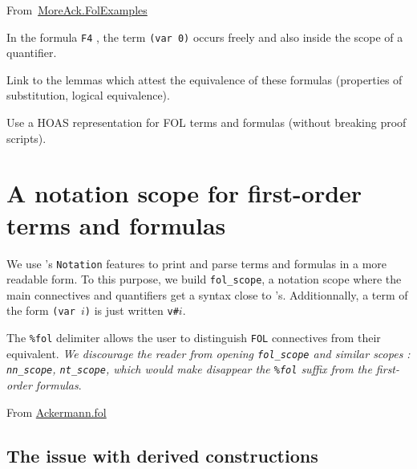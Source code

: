 \noindent From~\href{../theories/html/hydras.MoreAck.FolExamples.html}{MoreAck.FolExamples}
  

In the formula \texttt{F4} , the  term \texttt{(var 0)} occurs freely and also inside the scope of a quantifier.

  \begin{todo}
   Link to the lemmas which attest the equivalence of these formulas (properties of substitution, logical equivalence).
  \end{todo}


  \begin{project}
 Use a HOAS representation for FOL terms and formulas (without breaking proof scripts).   
  \end{project}



\section{A notation scope for first-order terms and formulas}
\label{sect:fol-notations}


 We use \coq's \texttt{Notation} features to print and parse terms and formulas  in a more readable form.
To this purpose, we build \texttt{fol\_scope}, a  notation scope
where the main connectives and quantifiers get a syntax close to \coq's.  Additionnally, a term of the form \texttt{(var $i$)} is
just written \texttt{v\#$i$}.



The \texttt{\%fol} delimiter 
allows the user to distinguish \texttt{FOL} connectives from their \coq equivalent.
\emph{We discourage the reader from \emph{opening} \texttt{fol\_scope} and similar scopes : \texttt{nn\_scope}, \texttt{nt\_scope}, which would make disappear the \texttt{\%fol} suffix from the first-order formulas}.


\vspace{6pt}

\noindent From \href{../theories/html/hydras.Ackermann.fol.html}{Ackermann.fol}



\subsection{The issue with derived constructions}
\label{sect:fol-issue}



